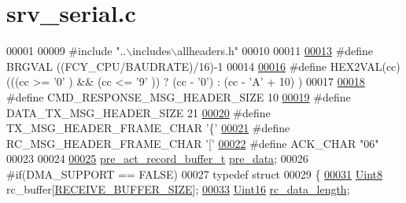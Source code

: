 \hypertarget{a00028_source}{\section{srv\+\_\+serial.\+c}
\label{a00028_source}
}

\begin{DoxyCode}
00001 
00009 \textcolor{preprocessor}{#include "..\(\backslash\)includes\(\backslash\)allheaders.h"} 
00010 
00011 
\hypertarget{a00028_source_l00013}{}\hyperlink{a00028_aca346e181d2ffc089e22e75736a6ff63}{00013} \textcolor{preprocessor}{#define BRGVAL          ((FCY\_CPU/BAUDRATE)/16)-1}
00014 
\hypertarget{a00028_source_l00016}{}\hyperlink{a00028_a428b04d2e2f2da2ea031a6c731660a71}{00016} \textcolor{preprocessor}{#define HEX2VAL(cc)  (((cc >= '0' ) && (cc <= '9' )) ? (cc - '0') : (cc - 'A' + 10) )}
00017 
\hypertarget{a00028_source_l00018}{}\hyperlink{a00028_a70cf18090d97bf40a74a6ff7fd56d888}{00018} \textcolor{preprocessor}{#define CMD\_RESPONSE\_MSG\_HEADER\_SIZE     10}
\hypertarget{a00028_source_l00019}{}\hyperlink{a00028_a7704c8abe93ef4188dd1562167bdbe63}{00019} \textcolor{preprocessor}{#define DATA\_TX\_MSG\_HEADER\_SIZE          21}
\hypertarget{a00028_source_l00020}{}\hyperlink{a00028_ae744e762e849a4701bf982655b5dc2db}{00020} \textcolor{preprocessor}{#define TX\_MSG\_HEADER\_FRAME\_CHAR         '\{'}
\hypertarget{a00028_source_l00021}{}\hyperlink{a00028_a5470c21188de014a742af7a64aeb23a0}{00021} \textcolor{preprocessor}{#define RC\_MSG\_HEADER\_FRAME\_CHAR         '['}
\hypertarget{a00028_source_l00022}{}\hyperlink{a00028_a2c59f95209427bfe2c53a30515cfbeda}{00022} \textcolor{preprocessor}{#define ACK\_CHAR                         "06"}
00023 
00024 
\hypertarget{a00028_source_l00025}{}\hyperlink{a00028_a448db071f92912b830a4aabd08c45d0c}{00025} \hyperlink{a00020_d8/ddc/a00655}{pre\_act\_record\_buffer\_t} \hyperlink{a00028_a448db071f92912b830a4aabd08c45d0c}{pre\_data};
00026 \textcolor{preprocessor}{#if(DMA\_SUPPORT == FALSE)}
00027 \textcolor{keyword}{typedef} \textcolor{keyword}{struct}
00029 \{
\hypertarget{a00028_source_l00031}{}\hyperlink{a00028_ac734cb8be27f86bd99edc539434883a4}{00031}     \hyperlink{a00070_af84840501dec18061d18a68c162a8fa2}{Uint8}     rc\_buffer[\hyperlink{a00029_aa49ab378520c95fea987f93a7f3c9abf}{RECEIVE\_BUFFER\_SIZE}];
\hypertarget{a00028_source_l00033}{}\hyperlink{a00028_ab136d4fef2c523afd55b6ca74c46d7cc}{00033}     \hyperlink{a00070_a59a9f6be4562c327cbfb4f7e8e18f08b}{Uint16}    \hyperlink{a00028_ab136d4fef2c523afd55b6ca74c46d7cc}{rc\_data\_length};

\end{DoxyCode}
